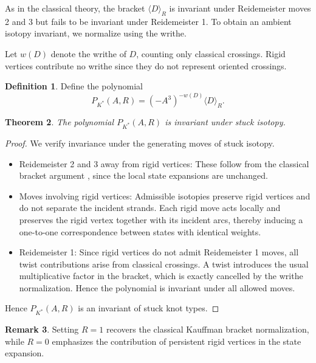 \documentclass[11pt,a4paper]{article}
\theoremstyle{plain}
\newtheorem{theorem}{Theorem}[section]
\theoremstyle{definition}
\newtheorem{definition}[theorem]{Definition}
\newtheorem{remark}[theorem]{Remark}
\begin{document}
As in the classical theory, the bracket $\langle D \rangle_R$ is invariant under Reidemeister moves 2 and 3 but fails to be invariant under Reidemeister 1. To obtain an ambient isotopy invariant, we normalize using the writhe.

Let $w(D)$ denote the writhe of $D$, counting only classical crossings. Rigid vertices contribute no writhe since they do not represent oriented crossings.

\begin{definition}
Define the polynomial
\[
P_{K^*}(A,R)
=
(-A^3)^{-w(D)}\langle D\rangle_R.
\]
\end{definition}

\begin{theorem}\label{invariant}
The polynomial $P_{K^*}(A,R)$ is invariant under stuck isotopy.
\end{theorem}

\begin{proof}
We verify invariance under the generating moves of stuck isotopy.

\begin{itemize}
\item Reidemeister 2 and 3 away from rigid vertices: These follow from the classical bracket argument \cite{Kauffman1987}, since the local state expansions are unchanged.
\item Moves involving rigid vertices: Admissible isotopies preserve rigid vertices and do not separate the incident strands. Each rigid move acts locally and preserves the rigid vertex together with its incident arcs, thereby inducing a one-to-one correspondence between states with identical weights.
\item Reidemeister 1: Since rigid vertices do not admit Reidemeister 1 moves, all twist contributions arise from classical crossings. A twist introduces the usual multiplicative factor in the bracket, which is exactly cancelled by the writhe normalization. Hence the polynomial is invariant under all allowed moves.
\end{itemize}
Hence $P_{K^*}(A,R)$ is an invariant of stuck knot types.
\end{proof}

\begin{remark}
Setting $R=1$ recovers the classical Kauffman bracket normalization, while $R=0$ emphasizes the contribution of persistent rigid vertices in the state expansion.
\end{remark}


\end{document}
